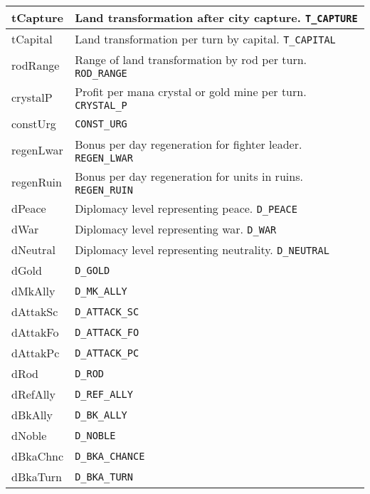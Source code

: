 \begin{center}
\begin{tabularx}{\linewidth}{| l | X |}
\hline
tCapture & Land transformation after city capture. \texttt{T\_CAPTURE}\\
\hline
tCapital & Land transformation per turn by capital. \texttt{T\_CAPITAL}\\
\hline
rodRange & Range of land transformation by rod per turn. \texttt{ROD\_RANGE}\\
\hline
crystalP & Profit per mana crystal or gold mine per turn. \texttt{CRYSTAL\_P}\\
\hline
constUrg & \texttt{CONST\_URG}\\
\hline
regenLwar & Bonus per day regeneration for fighter leader. \texttt{REGEN\_LWAR}\\
\hline
regenRuin & Bonus per day regeneration for units in ruins. \texttt{REGEN\_RUIN}\\
\hline
dPeace & Diplomacy level representing peace. \texttt{D\_PEACE}\\
\hline
dWar & Diplomacy level representing war. \texttt{D\_WAR}\\
\hline
dNeutral & Diplomacy level representing neutrality. \texttt{D\_NEUTRAL}\\
\hline
dGold & \texttt{D\_GOLD}\\
\hline
dMkAlly & \texttt{D\_MK\_ALLY}\\
\hline
dAttakSc & \texttt{D\_ATTACK\_SC}\\
\hline
dAttakFo & \texttt{D\_ATTACK\_FO}\\
\hline
dAttakPc & \texttt{D\_ATTACK\_PC}\\
\hline
dRod & \texttt{D\_ROD}\\
\hline
dRefAlly & \texttt{D\_REF\_ALLY}\\
\hline
dBkAlly & \texttt{D\_BK\_ALLY}\\
\hline
dNoble & \texttt{D\_NOBLE}\\
\hline
dBkaChnc & \texttt{D\_BKA\_CHANCE}\\
\hline
dBkaTurn & \texttt{D\_BKA\_TURN}\\
\hline
\end{tabularx}
\end{center}
